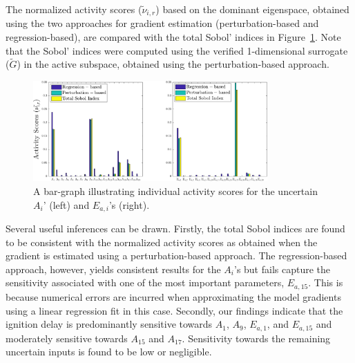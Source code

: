 The normalized activity scores ($\tilde{\nu}_{i,r}$) based on the dominant eigenspace, obtained
using the two approaches for gradient estimation (perturbation-based and regression-based),
are compared with the 
total Sobol' indices
in Figure~\ref{fig:as_33D}. Note that the Sobol' indices were computed using the verified
1-dimensional surrogate ($\tilde{G}$) in the active subspace, obtained using the 
perturbation-based approach. 
%
\begin{figure}[htbp]
 \begin{center}
  \includegraphics[width=0.8\textwidth]{./Figures/as_33D_new2}
\caption{A bar-graph illustrating individual activity scores for the uncertain $A_i$' (left) and $E_{a,i}$'s (right).}
\label{fig:as_33D}
\end{center}
\end{figure}
%
Several useful inferences can be drawn. Firstly, the total Sobol indices are found to be
consistent
with the normalized activity scores as obtained when the gradient is estimated using a perturbation-based approach.
The regression-based
approach, however, yields consistent results for the $A_i$'s but fails capture the sensitivity associated with one
of the most important parameters, $E_{a,15}$. This is because numerical errors are incurred when approximating
the model gradients using a linear regression fit in this case. 
Secondly, our findings indicate that   
the ignition delay is predominantly sensitive towards $A_1$, $A_9$, $E_{a,1}$, and $E_{a,15}$ and 
moderately sensitive towards $A_{15}$ and $A_{17}$. Sensitivity towards the remaining uncertain inputs is
found to be low or negligible. 

